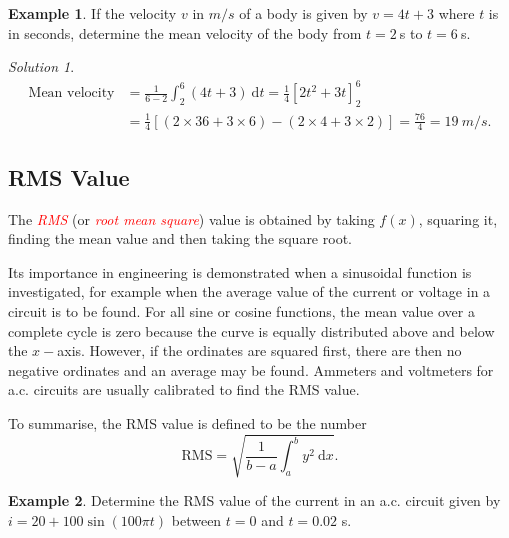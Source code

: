 \documentclass[
  11pt,
  oneside]{book}
\newcommand{\slide}{}
\theoremstyle{definition}
\theoremstyle{definition}
\newtheorem{example}{Example}[chapter]
\theoremstyle{definition}
\theoremstyle{definition}
\theoremstyle{remark}
\newtheorem*{solution}{Solution}
\begin{document}
\slide

\begin{example}
If the velocity \(v\) in \(m/s\) of a body is given by \(v=4t+3\) where \(t\) is in seconds, determine the mean velocity of the body from \(t=2\ \)s to \(t=6\ \)s.
\end{example}

\begin{solution}
\begin{align*}
\text{Mean velocity}& = \frac{1}{6-2}\int_2^6(4t+3)\ \mathrm{d}t = \frac 14\left[2t^2+3t\right]_2^6\\
&= \frac 14\left[(2\times36+3\times6) -(2\times4+3\times2)\right] = \frac{76}{4}=19\ m/s.
\end{align*}
\end{solution}

\slide

\subsection{RMS Value}\label{rms-value}

The \textcolor{red}{\em RMS} (or \textcolor{red}{\em root mean square}) value is obtained by taking \(f(x)\), squaring it, finding the mean value and then taking the square root.

Its importance in engineering is demonstrated when a sinusoidal function is investigated, for example when the average value of the current or voltage in a circuit is to be found. For all sine or cosine functions, the mean value over a complete cycle is zero because the curve is equally distributed above and below the \(x-\)axis. However, if the ordinates are squared first, there are then no negative ordinates and an average may be found. Ammeters and voltmeters for a.c. circuits are usually calibrated to find the RMS value.

To summarise, the RMS value is defined to be the number
\[
\text{RMS} = \sqrt{\frac{1}{b-a}\int_a^b y^2\ \mathrm{d}x}.
\]
\slide

\begin{example}
Determine the RMS value of the current in an a.c. circuit given by \(i=20+100\sin(100\pi t)\) between \(t=0\) and \(t=0.02\) s.
\end{example}
\end{document}
